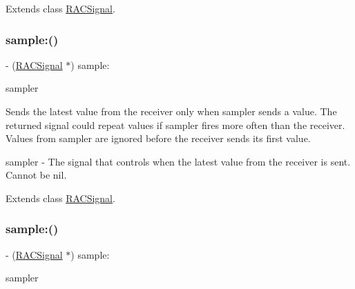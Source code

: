 Extends class \mbox{\hyperlink{interface_r_a_c_signal_a3601540c46ceb34dbd1c242782022809}{R\+A\+C\+Signal}}.

\mbox{\label{category_r_a_c_signal_07_operations_08_a556702f113ba65f01fabf8363bd25e46}} 
\subsubsection{\texorpdfstring{sample\+:()}{sample:()}\hspace{0.1cm}{\footnotesize\ttfamily [1/3]}}
{\footnotesize\ttfamily -\/ (\mbox{\hyperlink{interface_r_a_c_signal}{R\+A\+C\+Signal}} $\ast$) sample\+: \begin{DoxyParamCaption}\item[{(\mbox{\hyperlink{interface_r_a_c_signal}{R\+A\+C\+Signal}} $\ast$)}]{sampler }\end{DoxyParamCaption}}

Sends the latest value from the receiver only when {\ttfamily sampler} sends a value. The returned signal could repeat values if {\ttfamily sampler} fires more often than the receiver. Values from {\ttfamily sampler} are ignored before the receiver sends its first value.

sampler -\/ The signal that controls when the latest value from the receiver is sent. Cannot be nil. 

Extends class \mbox{\hyperlink{interface_r_a_c_signal_a556702f113ba65f01fabf8363bd25e46}{R\+A\+C\+Signal}}.

\mbox{\label{category_r_a_c_signal_07_operations_08_a556702f113ba65f01fabf8363bd25e46}} 
\subsubsection{\texorpdfstring{sample\+:()}{sample:()}\hspace{0.1cm}{\footnotesize\ttfamily [2/3]}}
{\footnotesize\ttfamily -\/ (\mbox{\hyperlink{interface_r_a_c_signal}{R\+A\+C\+Signal}} $\ast$) sample\+: \begin{DoxyParamCaption}\item[{(\mbox{\hyperlink{interface_r_a_c_signal}{R\+A\+C\+Signal}} $\ast$)}]{sampler }\end{DoxyParamCaption}}

